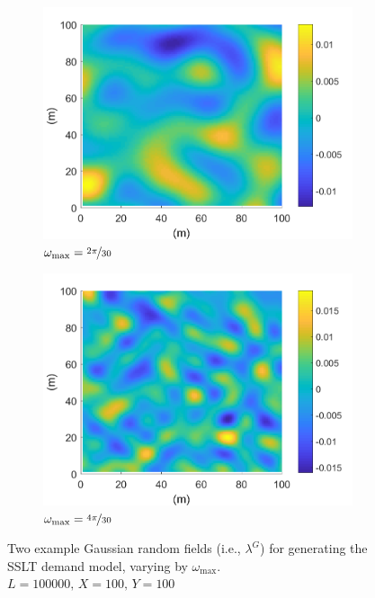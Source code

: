 \documentclass[12pt,dvipsnames]{report}
\begin{document}
\begin{figure}[ht]
	\centering
	\begin{subfigure}{.49\textwidth}
		\centering
		\includegraphics[width=1\linewidth]{lambdaG_O2pi-300_L100000_X100_Y100}
		\caption{\small $\omega_{\max}=\nicefrac{2 \pi}{30}$}
		\label{fig:lambdaG_2pi-300}
	\end{subfigure} \hfill
	\begin{subfigure}{.49\textwidth}
		\centering
		\includegraphics[width=1\linewidth]{lambdaG_O4pi-300_L100000_X100_Y100}
		\caption{\small $\omega_{\max}=\nicefrac{4 \pi}{30}$}
		\label{fig:lambdaG_4pi-300}
	\end{subfigure}
	\caption[Example Gaussian random fields for SSLT demand model generation]{\small Two example Gaussian random fields (i.e., $\lambda^G$) for generating the SSLT demand model, varying by $\omega_{\max}$.  $L = 100000,\, X = 100,\, Y = 100$}
	\label{fig:lambdaG}
\end{figure}
\end{document}
